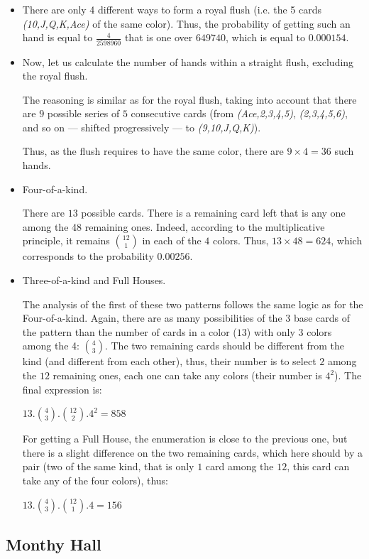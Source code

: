 \begin{itemize}
\item
There are only 4 different ways to form a royal flush (i.e. the 5 cards  \textit{(10,J,Q,K,Ace)} of the same color). 
Thus, the probability of getting such an hand is equal to $\frac{4}{2 598 960}$ that is one over $649740$, which is equal to $0.000154$.
\item
Now, let us calculate the number of hands within a straight flush, excluding the royal flush.

The reasoning is similar as for the royal flush, taking into account that there are $9$ possible series of $5$ consecutive cards
(from \textit{(Ace,2,3,4,5)}, \textit{(2,3,4,5,6)}, and so on --- shifted progressively --- to \textit{(9,10,J,Q,K)}).

Thus, as the flush requires to have the same color, there are $9 \times 4 = 36$ such hands. 
\item
Four-of-a-kind.

There are $13$ possible cards. There is a remaining card left that is any one among the 48 remaining ones.
Indeed, according to the multiplicative principle, it remains ${12 \choose 1}$ in each of the $4$ colors. 
Thus, $13 \times 48 = 624$, which corresponds to the probability $0.00256$.
\item
Three-of-a-kind and Full Houses.

The analysis of the first of these two patterns follows the same logic as for the Four-of-a-kind.
Again, there are as many possibilities of the $3$ base cards of the pattern than the number of cards in a color ($13$)
with only $3$ colors among the 4: ${4 \choose 3}$.
The two remaining cards should be different from the kind (and different from each other), 
thus, their number is to select $2$ among the $12$ remaining ones,
each one can take any colors (their number is $4^2$).
The final expression is:

$13.{4 \choose 3}.{12 \choose 2}.4^2 = 858$

For getting a Full House, the enumeration is close to the previous one, but there is a slight difference 
on the two remaining cards,
which here should by a pair (two of the same kind, that is only $1$ card among the $12$, 
this card can take any of the four colors),
thus:

$13.{4 \choose 3}.{12 \choose 1}.4 = 156$
\end{itemize}


\subsection{Monthy Hall}

